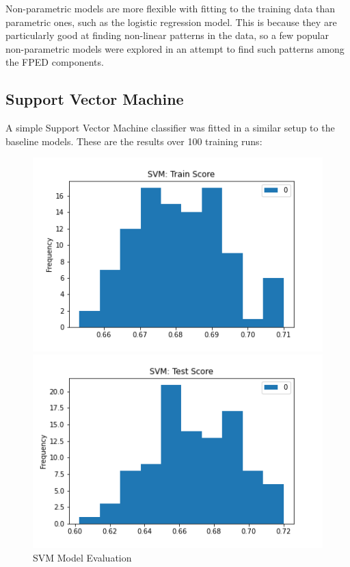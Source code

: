 \documentclass{article}
\begin{document}
Non-parametric models are more flexible with fitting to the training data than parametric ones, such as the logistic regression model. This is because they are particularly good at finding non-linear patterns in the data, so a few popular non-parametric models were explored in an attempt to find such patterns among the FPED components. 
\subsection{Support Vector Machine}
\label{ssec:subhead}

A simple Support Vector Machine classifier was fitted in a similar setup to the baseline models. These are the results over 100 training runs:\\

\begin{figure}[htb]
\begin{minipage}[b]{.48\linewidth}
  \centering
  \centerline{\includegraphics[scale=0.3]{SVM_Train_Score.png}}
\end{minipage}
\hfill
\begin{minipage}[b]{0.48\linewidth}
  \centering
  \centerline{\includegraphics[scale=0.3]{SVM_Test_Score.png}}
\end{minipage}
\caption{SVM Model Evaluation}
\label{fig:res}
\end{figure}
\end{document}
